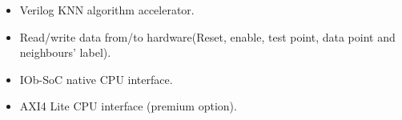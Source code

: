 \begin{itemize}
\item Verilog KNN algorithm accelerator.
\item Read/write data from/to hardware(Reset, enable, test point, data point and neighbours' label).
\item IOb-SoC native CPU interface.
\item AXI4 Lite CPU interface (premium option).
\end{itemize}
